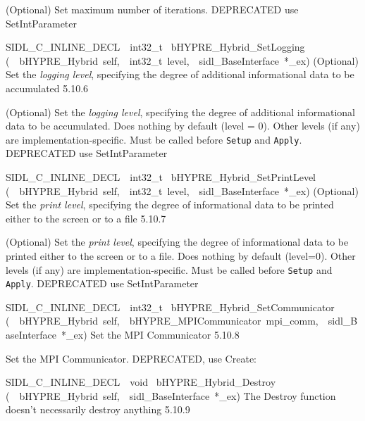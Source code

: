 \documentclass{article}
\begin{document}
\begin{cxxentry}
\begin{cxxentry}
\begin{cxxfunction}
\begin{cxxdoc}
(Optional) Set maximum number of iterations.
DEPRECATED   use SetIntParameter
\end{cxxdoc}
\end{cxxfunction}
\begin{cxxfunction}
{SIDL\_C\_INLINE\_DECL\ \ int32\_t\ }
        {bHYPRE\_Hybrid\_SetLogging}
        {(\ \ bHYPRE\_Hybrid\ self,\ \ int32\_t\ level,\ \ sidl\_BaseInterface\ *\_ex)}
        {
(Optional) Set the {\it logging level}, specifying the degree
of additional informational data to be accumulated}
        {5.10.6}
\begin{cxxdoc}

(Optional) Set the {\it logging level}, specifying the degree
of additional informational data to be accumulated.  Does
nothing by default (level = 0).  Other levels (if any) are
implementation-specific.  Must be called before {\tt Setup}
and {\tt Apply}.
DEPRECATED   use SetIntParameter
\end{cxxdoc}
\end{cxxfunction}
\begin{cxxfunction}
{SIDL\_C\_INLINE\_DECL\ \ int32\_t\ }
        {bHYPRE\_Hybrid\_SetPrintLevel}
        {(\ \ bHYPRE\_Hybrid\ self,\ \ int32\_t\ level,\ \ sidl\_BaseInterface\ *\_ex)}
        {
(Optional) Set the {\it print level}, specifying the degree
of informational data to be printed either to the screen or
to a file}
        {5.10.7}
\begin{cxxdoc}

(Optional) Set the {\it print level}, specifying the degree
of informational data to be printed either to the screen or
to a file.  Does nothing by default (level=0).  Other levels
(if any) are implementation-specific.  Must be called before
{\tt Setup} and {\tt Apply}.
DEPRECATED   use SetIntParameter
\end{cxxdoc}
\end{cxxfunction}
\begin{cxxfunction}
{SIDL\_C\_INLINE\_DECL\ \ int32\_t\ }
        {bHYPRE\_Hybrid\_SetCommunicator}
        {(\ \ bHYPRE\_Hybrid\ self,\ \ bHYPRE\_MPICommunicator\ mpi\_comm,\ \ sidl\_BaseInterface\ *\_ex)}
        {
Set the MPI Communicator}
        {5.10.8}
\begin{cxxdoc}

Set the MPI Communicator.
DEPRECATED, use Create:
\end{cxxdoc}
\end{cxxfunction}
\begin{cxxfunction}
{SIDL\_C\_INLINE\_DECL\ \ void\ }
        {bHYPRE\_Hybrid\_Destroy}
        {(\ \ bHYPRE\_Hybrid\ self,\ \ sidl\_BaseInterface\ *\_ex)}
        {
The Destroy function doesn't necessarily destroy anything}
        {5.10.9}
\begin{cxxdoc}


\end{cxxdoc}
\end{cxxfunction}
\end{cxxentry}
\end{cxxentry}
\end{document}
